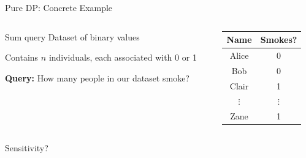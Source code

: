 \documentclass[12pt,aspectratio=169]{beamer}
\begin{document}
\begin{frame}{Pure DP: Concrete Example}

\begin{columns}[T]

\begin{column}{.5\textwidth}

\begin{block}{Sum query}
Dataset of binary values

Contains $n$ individuals, each associated with 0 or 1

\textbf{Query:} How many people in our dataset smoke?
\end{block}

\end{column}

\begin{column}{.5\textwidth}

\begin{table}[]
    \centering
    \begin{tabular}{c|c}
    Name    &   Smokes?\\
    \hline
    Alice     &  0\\
    Bob     & 0\\
    Clair     & 1\\
    $\vdots$    & $\vdots$\\
    Zane    &   1\\
    \end{tabular}
\end{table}

\end{column}
\end{columns}

\vspace{5mm}

Sensitivity?

\end{frame}
\end{document}
